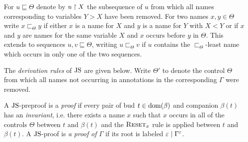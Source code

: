 For $u \sqsubseteq \Theta$ denote by $u \uh X$ the
subsequence of $u$ from which all names corresponding to variables $Y > X$ have
been removed. For two names $x, y \in \Theta$ write $x \sqsubset_\Theta y$
if either $x$ is a name for $X$ and $y$ is a name for $Y$ with $X < Y$ or if $x$
and $y$ are names for the same variable $X$ and $x$ occurs before $y$ in
$\Theta$. This extends to sequences $u, v \sqsubseteq \Theta$, writing $u
\sqsubset_\Theta v$ if $u$ contains the $\sqsubset_\Theta$-least name which
occurs in only one of the two sequences.

\begin{definition}
  The \emph{derivation rules} of $\JS$ are given below. Write $\Theta'$ to
  denote the control $\Theta$ from which all names not occurring in annotations
  in the corresponding $\Gamma$ were removed.
  \begin{mathpar}







  \end{mathpar}

  A $\JS$-preproof is a \emph{proof} if
  every pair of bud $t
  \in \dom(\beta)$ and companion $\beta(t)$ has an \emph{invariant}, i.e. there
  exists a name $x$ such that $x$ occurs in all of the controls
  $\Theta$ between $t$ and $\beta(t)$ and the $\textsc{Reset}_x$ rule
  is applied between $t$ and $\beta(t)$.
  A $\JS$-proof is \emph{a proof 
    of $\Gamma$} if its root
  is labeled $\varepsilon \rsep \Gamma^\varepsilon$.
\end{definition}

